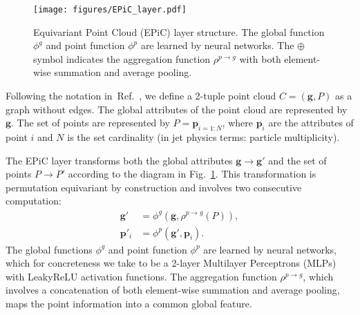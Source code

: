 \documentclass[a4paper,submission, Phys]{SciPost}
\DeclareRobustCommand{\Fig}[1]{Fig.~\ref{fig:#1}}
\DeclareRobustCommand{\Reff}[1]{Ref.~\cite{#1}}
\begin{document}
\begin{figure}[tbp]
\centering
\texttt{[image: figures/EPiC\_layer.pdf]}
\caption{\label{fig:i}
%
Equivariant Point Cloud (EPiC) layer structure.
%
The global function $\phi^g$ and point function $\phi^p$  are learned by neural networks.
%
The $\oplus$ symbol indicates the aggregation function $\rho^{p \rightarrow g}$ with both element-wise summation and average pooling.}
\label{fig:EPiC_layer}
\end{figure}

Following the notation in~\Reff{BattagliaGN}, we define a 2-tuple point cloud $C = (\boldsymbol{g}, P)$ as a graph without edges.
%
The global attributes of the point cloud are represented by $\boldsymbol{g}$.
%
The set of points are represented by $P = \boldsymbol{p}_{i=1:N}$, where $\boldsymbol{p}_i$ are the attributes of point $i$ and $N$
%
is the set cardinality (in jet physics terms: particle multiplicity).


The EPiC layer transforms both the global attributes $\boldsymbol{g} \rightarrow \boldsymbol{g}'$ and the set of points $P \rightarrow P'$ according to the diagram in \Fig{EPiC_layer}.
%
This transformation is permutation equivariant by construction and involves two consecutive computation:
%
\begin{align}
    \boldsymbol{g}' &= \phi^g(\boldsymbol{g}, \rho^{p \to g}(P)), \\
    \boldsymbol{p}'_i &= \phi^p(\boldsymbol{g}',\boldsymbol{p}_i).
\end{align}
%
The global functions $\phi^g$ and point function $\phi^p$ are learned by neural networks, which for concreteness we take to be a 2-layer Multilayer Perceptrons (MLPs) with LeakyReLU activation functions.
%
The aggregation function $\rho^{p \to g}$, which involves a concatenation of both element-wise summation and average pooling, maps the point information into a common global feature.
\end{document}
